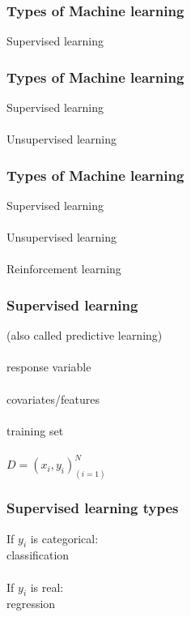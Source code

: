 \documentclass{beamer}
\begin{document}
\begin{frame}
	\frametitle{Types of Machine learning}
	\begin{center}
		Supervised learning
	\end{center}
\end{frame}

\begin{frame}
	\frametitle{Types of Machine learning}
	\begin{center}
		Supervised learning\\~\\
		Unsupervised learning
	\end{center}
\end{frame}

\begin{frame}
	\frametitle{Types of Machine learning}
	\begin{center}
		Supervised learning\\~\\
		Unsupervised learning\\~\\
		Reinforcement learning
	\end{center}
\end{frame}

\begin{frame}
	\frametitle{Supervised learning}
	\begin{center}
		(also called predictive learning)\\~\\
		response variable\\~\\
		covariates/features\\~\\
		training set\\~\\
		$D = (x_i,y_i)_{(i=1)}^N$
	\end{center}
\end{frame}

\begin{frame}
	\frametitle{Supervised learning types}
	\begin{center}
		If $y_i$ is categorical:\\
		classification\\~\\
		If $y_i$ is real:\\
		regression
	\end{center}
\end{frame}
\end{document}
